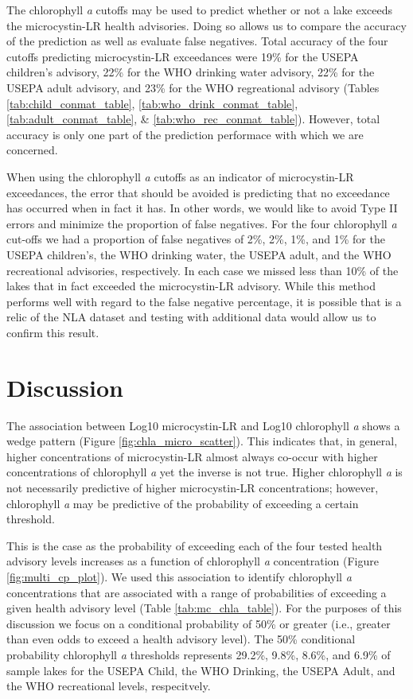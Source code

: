 \documentclass[11pt,]{article}
\begin{document}
The chlorophyll \emph{a} cutoffs may be used to predict whether or not a
lake exceeds the microcystin-LR health advisories. Doing so allows us to
compare the accuracy of the prediction as well as evaluate false
negatives. Total accuracy of the four cutoffs predicting microcystin-LR
exceedances were 19\% for the USEPA children's advisory, 22\% for the
WHO drinking water advisory, 22\% for the USEPA adult advisory, and 23\%
for the WHO regreational advisory (Tables \ref{tab:child_conmat_table},
\ref{tab:who_drink_conmat_table}, \ref{tab:adult_conmat_table}, \&
\ref{tab:who_rec_conmat_table}). However, total accuracy is only one
part of the prediction performace with which we are concerned.

When using the chlorophyll \emph{a} cutoffs as an indicator of
microcystin-LR exceedances, the error that should be avoided is
predicting that no exceedance has occurred when in fact it has. In other
words, we would like to avoid Type II errors and minimize the proportion
of false negatives. For the four chlorophyll \emph{a} cut-offs we had a
proportion of false negatives of 2\%, 2\%, 1\%, and 1\% for the USEPA
children's, the WHO drinking water, the USEPA adult, and the WHO
recreational advisories, respectively. In each case we missed less than
10\% of the lakes that in fact exceeded the microcystin-LR advisory.
While this method performs well with regard to the false negative
percentage, it is possible that is a relic of the NLA dataset and
testing with additional data would allow us to confirm this result.

\section{Discussion}\label{discussion}

The association between Log10 microcystin-LR and Log10 chlorophyll
\emph{a} shows a wedge pattern (Figure \ref{fig:chla_micro_scatter}).
This indicates that, in general, higher concentrations of microcystin-LR
almost always co-occur with higher concentrations of chlorophyll
\emph{a} yet the inverse is not true. Higher chlorophyll \emph{a} is not
necessarily predictive of higher microcystin-LR concentrations; however,
chlorophyll \emph{a} may be predictive of the probability of exceeding a
certain threshold.

This is the case as the probability of exceeding each of the four tested
health advisory levels increases as a function of chlorophyll \emph{a}
concentration (Figure \ref{fig:multi_cp_plot}). We used this association
to identify chlorophyll \emph{a} concentrations that are associated with
a range of probabilities of exceeding a given health advisory level
(Table \ref{tab:mc_chla_table}). For the purposes of this discussion we
focus on a conditional probability of 50\% or greater (i.e., greater
than even odds to exceed a health advisory level). The 50\% conditional
probability chlorophyll \emph{a} thresholds represents 29.2\%, 9.8\%,
8.6\%, and 6.9\% of sample lakes for the USEPA Child, the WHO Drinking,
the USEPA Adult, and the WHO recreational levels, respecitvely.
\end{document}
